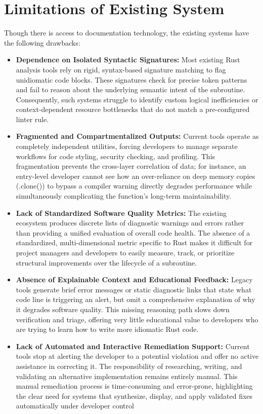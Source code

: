 \section{Limitations of Existing System}
\hspace{0.5cm}
Though there is access to documentation technology, the existing systems have the following drawbacks:

\begin{itemize}
\item \textbf{Dependence on Isolated Syntactic Signatures:} Most existing Rust analysis tools rely on rigid, syntax-based signature matching to flag unidiomatic code blocks. These signatures check for precise token patterns and fail to reason about the underlying semantic intent of the subroutine. Consequently, such systems struggle to identify custom logical inefficiencies or context-dependent resource bottlenecks that do not match a pre-configured linter rule.

\item \textbf{Fragmented and Compartmentalized Outputs:} Current tools operate as completely independent utilities, forcing developers to manage separate workflows for code styling, security checking, and profiling. This fragmentation prevents the cross-layer correlation of data; for instance, an entry-level developer cannot see how an over-reliance on deep memory copies (.clone()) to bypass a compiler warning directly degrades performance while simultaneously complicating the function’s long-term maintainability.

\item \textbf{Lack of Standardized Software Quality Metrics:} The existing ecosystem produces discrete lists of diagnostic warnings and errors rather than providing a unified evaluation of overall code health. The absence of a standardized, multi-dimensional metric specific to Rust makes it difficult for project managers and developers to easily measure, track, or prioritize structural improvements over the lifecycle of a subroutine.

\item \textbf{Absence of Explainable Context and Educational Feedback:} Legacy tools generate brief error messages or static diagnostic links that state what code line is triggering an alert, but omit a comprehensive explanation of why it degrades software quality. This missing reasoning path slows down verification and triage, offering very little educational value to developers who are trying to learn how to write more idiomatic Rust code.

\item \textbf{Lack of Automated and Interactive Remediation Support:} Current tools stop at alerting the developer to a potential violation and offer no active assistance in correcting it. The responsibility of researching, writing, and validating an alternative implementation remains entirely manual. This manual remediation process is time-consuming and error-prone, highlighting the clear need for systems that synthesize, display, and apply validated fixes automatically under developer control
\end{itemize}

